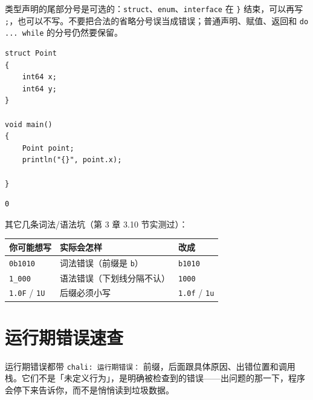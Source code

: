 类型声明的尾部分号是可选的：\texttt{struct}、\texttt{enum}、\texttt{interface} 在 \texttt{\}} 结束，可以再写 \texttt{;}，也可以不写。不要把合法的省略分号误当成错误；普通声明、赋值、返回和 \texttt{do .\allowbreak{}.\allowbreak{}.\allowbreak{} while} 的分号仍然要保留。

\par
\medskip
\begin{lstlisting}[style=chali]
struct Point
{
    int64 x;
    int64 y;
}

void main()
{
    Point point;
    println("{}", point.x);

}
\end{lstlisting}
\par
\medskip

\par
\medskip
\begin{lstlisting}[style=out]
0
\end{lstlisting}
\par
\medskip

其它几条词法/语法坑（第 3 章 3.10 节实测过）：

\begin{center}
\begin{tabular}{lll}
\toprule
你可能想写 & 实际会怎样 & 改成 \\
\midrule
\texttt{0b1010} & 词法错误（前缀是 \texttt{b}） & \texttt{b1010} \\
\texttt{1\_000} & 语法错误（下划线分隔不认） & \texttt{1000} \\
\texttt{1.\allowbreak{}0F} / \texttt{1U} & 后缀必须小写 & \texttt{1.\allowbreak{}0f} / \texttt{1u} \\
\bottomrule
\end{tabular}
\end{center}

\section{运行期错误速查}

运行期错误都带 \texttt{chali:\allowbreak{} 运行期错误：} 前缀，后面跟具体原因、出错位置和调用栈。它们不是「未定义行为」，是明确被检查到的错误——出问题的那一下，程序会停下来告诉你，而不是悄悄读到垃圾数据。

